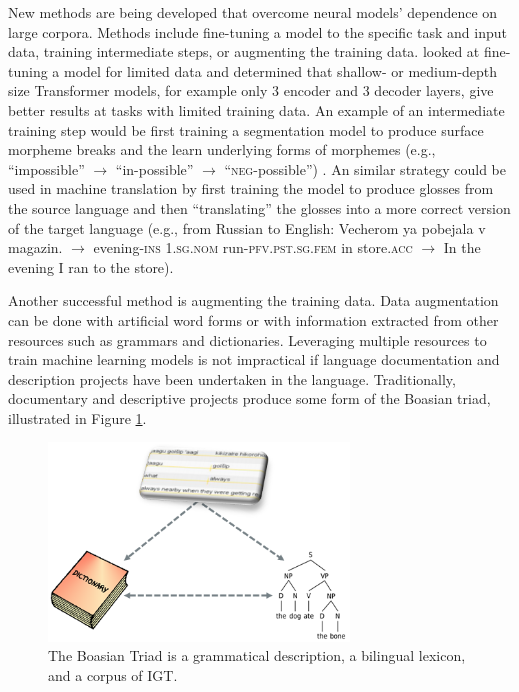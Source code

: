 New methods are being developed that overcome neural models' dependence on large corpora. Methods include fine-tuning a model to the specific task and input data, training intermediate steps, or augmenting the training data.
\citet{van_biljon_optimal_2020} looked at fine-tuning a model for limited data and determined that shallow- or medium-depth size Transformer models, for example only 3 encoder and 3 decoder layers, give better results at tasks with limited training data. An example of an intermediate training step would be first training a segmentation model to produce surface morpheme breaks and the learn underlying forms of morphemes (e.g., ``impossible'' $\rightarrow$ ``in-possible'' $\rightarrow$ ``\textsc{neg}-possible'') \citep{cotterell_joint_2016,liu_morphological_2018,moeller_improving_2019}. An similar strategy could be used in machine translation by first training the model to produce glosses from the source language and then ``translating'' the glosses into a more correct version of the target language (e.g., from Russian to English: Vecherom ya pobejala v magazin. $\rightarrow$ evening-\textsc{ins} \textsc{1.sg.nom} run-\textsc{pfv.pst.sg.fem} in store.\textsc{acc} $\rightarrow$ In the evening I ran to the store).

Another successful method is augmenting the training data. 
Data augmentation can be done with artificial word forms \citep{liu_morphological_2018} or with information extracted from other resources such as grammars and dictionaries. Leveraging multiple resources to train machine learning models is not impractical if language documentation and description projects have been undertaken in the language. Traditionally, documentary and descriptive projects produce some form of the Boasian triad, illustrated in Figure \ref{fig:Triad}. 

\begin{figure}[!tb]
\begin{center}
\includegraphics[width=8cm]{figs/Triad.PNG}
\caption[The Boasian Triad]{The Boasian Triad is a grammatical description, a bilingual lexicon, and a corpus of IGT.}
\label{fig:Triad}
\end{center}
\end{figure}


